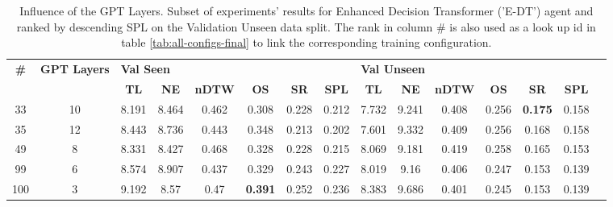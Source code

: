 \begin{table}
\centering
\caption{\label{tab:e_dt_layers}Influence of the GPT Layers. Subset of experiments' results for Enhanced Decision Transformer ('E-DT') agent and ranked by descending SPL on the Validation Unseen data split. The rank in column \# is also used as a look up id in table \ref{tab:all-configs-final} to link the corresponding training configuration.}
\begin{tabular}{@{\hskip3pt}c@{\hskip3pt}c@{\hskip3pt}c@{\hskip3pt}c@{\hskip3pt}c@{\hskip3pt}c@{\hskip3pt}c@{\hskip3pt}c@{\hskip3pt}c@{\hskip3pt}c@{\hskip3pt}c@{\hskip3pt}c@{\hskip3pt}c@{\hskip3pt}c@{\hskip3pt}c}
\toprule
\textbf{\#} & \textbf{GPT Layers} & \multicolumn{6}{l}{\textbf{Val Seen}} & \multicolumn{6}{l}{\textbf{Val Unseen}} \\
 \textbf{~} &          \textbf{~} &       \textbf{TL} & \textbf{NE} & \textbf{nDTW} &     \textbf{OS} & \textbf{SR} & \textbf{SPL} &         \textbf{TL} & \textbf{NE} & \textbf{nDTW} & \textbf{OS} &     \textbf{SR} & \textbf{SPL} \\
\midrule
         33 &                  10 &             8.191 &       8.464 &         0.462 &           0.308 &       0.228 &        0.212 &               7.732 &       9.241 &         0.408 &       0.256 &  \textbf{0.175} &        0.158 \\
         35 &                  12 &             8.443 &       8.736 &         0.443 &           0.348 &       0.213 &        0.202 &               7.601 &       9.332 &         0.409 &       0.256 &           0.168 &        0.158 \\
         49 &                   8 &             8.331 &       8.427 &         0.468 &           0.328 &       0.228 &        0.215 &               8.069 &       9.181 &         0.419 &       0.258 &           0.165 &        0.153 \\
         99 &                   6 &             8.574 &       8.907 &         0.437 &           0.329 &       0.243 &        0.227 &               8.019 &        9.16 &         0.406 &       0.247 &           0.153 &        0.139 \\
        100 &                   3 &             9.192 &        8.57 &          0.47 &  \textbf{0.391} &       0.252 &        0.236 &               8.383 &       9.686 &         0.401 &       0.245 &           0.153 &        0.139 \\
\bottomrule
\end{tabular}
\end{table}
